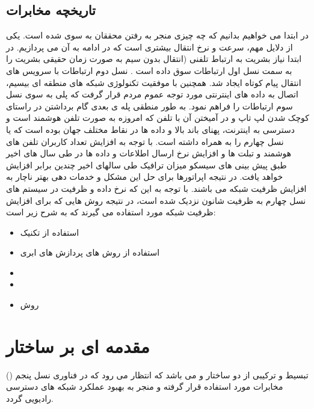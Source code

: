 \subsection{تاریخچه مخابرات}
در ابتدا می خواهیم بدانیم که چه چیزی منجر به رفتن محققان به سوی   شده است. یکی از دلایل مهم، سرعت و نرخ انتقال بیشتری است که در ادامه به آن می پردازیم.
در ابتدا نیاز بشریت به ارتباط تلفنی (انتقال بدون سیم به صورت زمان حقیقی  بشریت را به سمت نسل اول ارتباطات  سوق داده است . نسل دوم ارتباطات  با سرویس های انتقال پیام کوتاه ایجاد شد. همچنین با موفقیت تکنولوژی شبکه های منطقه ای بیسیم، اتصال به داده های اینترنتی مورد توجه عموم مردم قرار گرفت که پلی به سوی نسل سوم ارتباطات  را فراهم نمود. به طور منطقی پله ی بعدی گام برداشتن در راستای کوچک شدن لپ تاپ و در آمیختن آن با تلفن که امروزه به صورت تلفن هوشمند است و دسترسی به  اینترنت، پهنای باند بالا و داده ها در نقاط مختلف جهان بوده است که  یا نسل چهارم را به همراه داشته است.
با توجه به افزایش تعداد کاربران تلفن های
هوشمند و تبلت ها و افزایش نرخ ارسال اطلاعات و داده ها در طی سال
های اخیر طبق پیش بینی های سیسکو میزان ترافیک  طی سالهای اخیر
  چندین برابر افزایش خواهد یافت.
در نتیجه اپراتورها برای حل این مشکل و خدمات
دهی بهتر ناچار به افزایش ظرفیت شبکه می باشند. با توجه
به این که نرخ داده و ظرفیت در سیستم های نسل چهارم به ظرفیت
شانون نزدیک شده است، در نتیجه روش هایی که برای
افزایش ظرفیت شبکه مورد استفاده می گیرند که به شرح زیر است:
\begin{itemize}
\item
استفاده از تکنیک 
\item
استفاده از روش های پردازش های ابری
\item
{}
\item
{}
\item
روش 
\end{itemize}
\section{مقدمه ای بر ساختار }
()
تبسیط و ترکیبی از دو ساختار  و  می باشد که انتظار می رود که در فناوری نسل پنجم مخابرات مورد استفاده قرار گرفته و منجر به بهبود عملکرد شبکه های دسترسی رادیویی  گردد.

